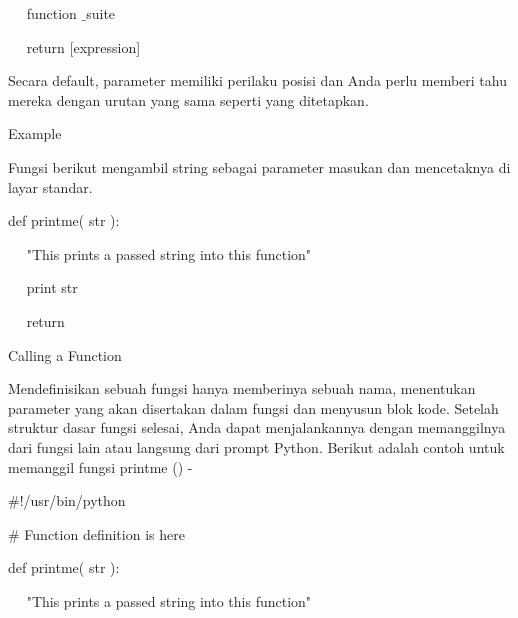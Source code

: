 \noindent 
~~  \hspace*{0.5in}  \hspace*{0.5in} function $  \_  $suite \par
\noindent 
~~  \hspace*{0.5in}  \hspace*{0.5in} return [expression] \par
\noindent 
Secara default, parameter memiliki perilaku posisi dan Anda perlu memberi tahu mereka dengan urutan yang sama seperti yang ditetapkan. \par
\vspace{12pt}
\noindent 
Example \par
\noindent 
Fungsi berikut mengambil string sebagai parameter masukan dan mencetaknya di layar standar. \par
\noindent 
 \hspace*{0.5in} def printme( str ): \par
\noindent 
~~  \hspace*{0.5in}  \hspace*{0.5in} "This prints a passed string into this function" \par
\noindent 
~~  \hspace*{0.5in}  \hspace*{0.5in} print str \par
\noindent 
~~  \hspace*{0.5in}  \hspace*{0.5in} return \par
\vspace{12pt}
\noindent 
Calling a Function \par
\noindent 
Mendefinisikan sebuah fungsi hanya memberinya sebuah nama, menentukan parameter yang akan disertakan dalam fungsi dan menyusun blok kode. Setelah struktur dasar fungsi selesai, Anda dapat menjalankannya dengan memanggilnya dari fungsi lain atau langsung dari prompt Python. Berikut adalah contoh untuk memanggil fungsi printme () - \par
\noindent 
 \hspace*{0.5in}  $  \#  $!/usr/bin/python \par
\vspace{12pt}
\noindent 
 \hspace*{0.5in}  $  \#  $ Function definition is here \par
\noindent 
 \hspace*{0.5in} def printme( str ): \par
\noindent 
~~  \hspace*{0.5in}  \hspace*{0.5in} "This prints a passed string into this function" \par
